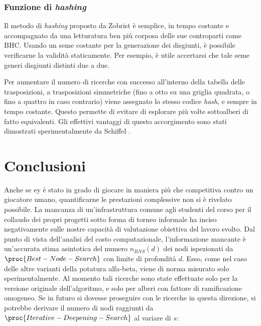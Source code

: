 \documentclass{article}
\begin{document}
\subsubsection{Funzione di \emph{hashing}}

Il metodo di \emph{hashing} proposto da Zobrist
\cite{edsoai.ocn79990521120120101} è semplice, in tempo costante e accompagnato
da una letturatura ben più corposa delle sue controparti come BHC. Usando un
seme costante per la generazione dei disgiunti, è possibile verificarne la
validità staticamente. Per esempio, è utile accertarsi che tale seme generi
disgiunti distinti due a due.

Per aumentare il numero di ricerche con successo all'interno della tabella delle
trasposizioni, a trasposizioni simmetriche (fino a otto su una griglia quadrata,
o fino a quattro in caso contrario) viene assegnato lo stesso codice
\emph{hash}, e sempre in tempo costante. Questo permette di evitare di esplorare
più volte sottoalberi di fatto equivalenti. Gli effettivi vantaggi di questo
accorgimento sono stati dimostrati sperimentalmente da Schiffel \cite{schiffel}.

\section{Conclusioni}

Anche se {
    ey
} è stato in grado di giocare in maniera più che competitiva contro un giocatore
umano, quantificarne le prestazioni complessive non si è rivelato possibile. La
mancanza di un'infrastruttura comune agli studenti del corso per il collaudo dei
propri progetti sotto forma di torneo informale ha inciso negativamente sulle
nostre capacità di valutazione obiettiva del lavoro svolto. Dal punto di vista
dell'analisi del costo computazionale, l'informazione mancante è un'accurata
stima asintotica del numero $n_{BNS}(d)$ dei nodi ispezionati da
$\proc{Best-Node-Search}$ con limite di profondità $d$. Esso, come nel caso
delle altre varianti della potatura alfa-beta, viene di norma misurato solo
sperimentalmente. Al momento tali ricerche sono state effettuate solo per la
versione originale dell'algoritmo, e solo per alberi con fattore di
ramificazione omogeneo. Se in futuro si dovesse proseguire con le ricerche in
questa direzione, si potrebbe derivare il numero di nodi raggiunti da
$\proc{Iterative-Deepening-Search}$ al variare di $s$:
\end{document}
